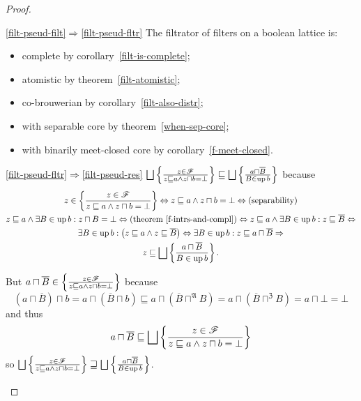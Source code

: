 \begin{proof}
~
\begin{widedisorder}
\item[\ref{filt-pseud-filt}$\Rightarrow$\ref{filt-pseud-fltr}]
  The filtrator of filters on a boolean lattice is:
  \begin{itemize}
  \item complete by corollary~\ref{filt-is-complete};
  \item atomistic by theorem~\ref{filt-atomistic};
  \item co-brouwerian by corollary~\ref{filt-also-distr};
  \item with separable core by theorem~\ref{when-sep-core};
  \item with binarily meet-closed core by corollary~\ref{f-meet-closed}.
  \end{itemize}

\item[\ref{filt-pseud-fltr}$\Rightarrow$\ref{filt-pseud-res}]
  $\bigsqcup \setcond{ z \in \mathscr{F} }{ z
  \sqsubseteq a \wedge z \sqcap b = \bot } \sqsubseteq \bigsqcup
  \setcond{ a \sqcap \overline{B} }{ B \in \up b }$ because
  \begin{multline*}
    z \in \setcond{ z \in \mathscr{F} }{ z \sqsubseteq
    a \wedge z \sqcap b = \bot } \Leftrightarrow z \sqsubseteq a \wedge
    z \sqcap b = \bot \Leftrightarrow \text{(separability)}\\
    z \sqsubseteq a \wedge \exists B \in \up b : z \sqcap B = \bot
    \Leftrightarrow \text{(theorem~\ref{f-intrs-and-compl})} \Leftrightarrow z \sqsubseteq a
    \wedge \exists B \in \up b : z \sqsubseteq \overline{B}
    \Leftrightarrow\\
    \exists B \in \up b : \left( z \sqsubseteq a \wedge z \sqsubseteq
    \overline{B} \right) \Leftrightarrow \exists B \in \up b : z
    \sqsubseteq a \sqcap \overline{B} \Rightarrow\\
    z \sqsubseteq \bigsqcup \setcond{ a \sqcap \overline{B} }{ B \in \up b } .
  \end{multline*}

  But $a \sqcap \overline{B} \in \left\{ \frac{ z \in \mathscr{F} }{ z \sqsubseteq a \wedge z \sqcap b = \bot }\right\}$ because
  \[ \left( a \sqcap \overline{B} \right) \sqcap b = a \sqcap \left(
     \overline{B} \sqcap b \right) \sqsubseteq a \sqcap \left( \overline{B}
     \sqcap^{\mathfrak{A}} B \right) = a \sqcap \left( \overline{B}
     \sqcap^{\mathfrak{Z}} B \right) = a \sqcap \bot = \bot \]
  and thus
  \[ a \sqcap \overline{B} \sqsubseteq \bigsqcup \setcond{ z \in \mathscr{F}
     }{ z \sqsubseteq a \wedge z \sqcap b = \bot
     } \]
  so $\bigsqcup \setcond{ z \in \mathscr{F} }{ z
  \sqsubseteq a \wedge z \sqcap b = \bot } \sqsupseteq \bigsqcup
  \setcond{ a \sqcap \overline{B} }{ B \in \up b
  }$.
\end{widedisorder}
\end{proof}

